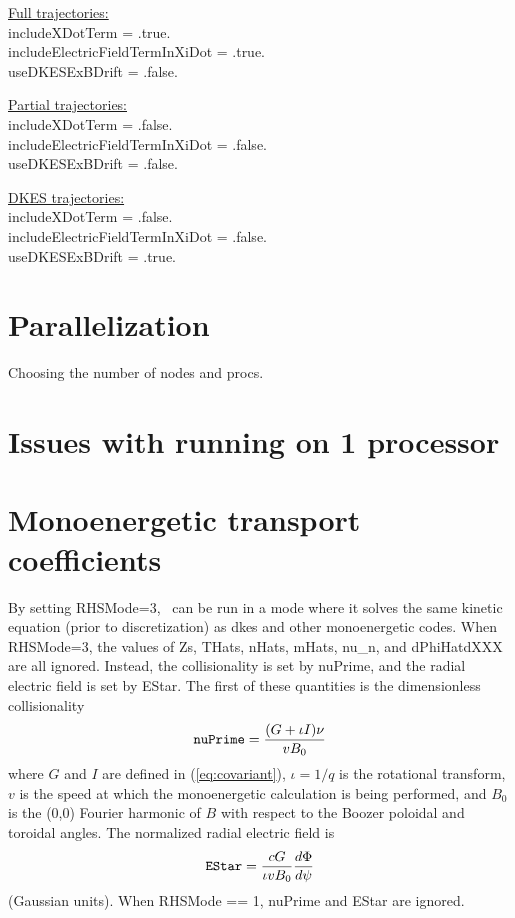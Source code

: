 {\setlength{\parindent}{0cm}

\underline{Full trajectories:}\\
{\ttfamily 
includeXDotTerm = .true.\\
includeElectricFieldTermInXiDot = .true.\\
useDKESExBDrift = .false.\\
}

\underline{Partial trajectories:}\\
{\ttfamily
includeXDotTerm = .false.\\
includeElectricFieldTermInXiDot = .false.\\
useDKESExBDrift = .false.\\
}

\underline{DKES trajectories:}\\
{\ttfamily
includeXDotTerm = .false.\\
includeElectricFieldTermInXiDot = .false.\\
useDKESExBDrift = .true.\\
}
}

\section{Parallelization}
Choosing the number of nodes and procs.

\section{Issues with running on 1 processor}

\section{Monoenergetic transport coefficients}
\label{sec:monoenergetic}

By setting {\ttfamily RHSMode=3}, \sfincs~can be run in a mode
where it solves the same kinetic equation (prior to discretization) as {\ttfamily dkes}
and other monoenergetic codes.
When {\ttfamily RHSMode=3}, the values of {\ttfamily Zs}, {\ttfamily THats}, {\ttfamily nHats},
{\ttfamily mHats}, {\ttfamily nu\_n}, and {\ttfamily dPhiHatdXXX} are all ignored.
Instead, the collisionality is set by {\ttfamily nuPrime}, and the radial electric field is set
by {\ttfamily EStar}.  The first of these quantities is the dimensionless collisionality
\begin{equation}
\mbox{\ttfamily nuPrime} = \frac{(G+\iota I) \nu}{v B_0}
\end{equation}
where $G$ and $I$ are defined in (\ref{eq:covariant}), $\iota=1/q$ is the rotational transform,
$v$ is the speed at which the monoenergetic calculation is being performed, and $B_0$ is the (0,0) Fourier harmonic of $B$
with respect to the Boozer poloidal and toroidal angles.
The normalized radial electric field is
\begin{equation}
\mbox{\ttfamily EStar} = \frac{cG}{\iota v B_0} \frac{d\Phi}{d\psi}
\end{equation}
(Gaussian units).
When {\ttfamily RHSMode} == 1, {\ttfamily nuPrime} and {\ttfamily EStar} are ignored.

